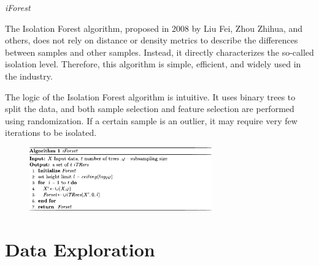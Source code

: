 \documentclass[
 size=14pt,
 paper=smartboard,  %
 mode=present, 		%
 display=slides, 	%
 style=tuliplab,  	%
 pauseslide,
 fleqn,leqno]{powerdot}
\begin{document}
\begin{slide}{\textit{iForest}}
\begin{justify}
\setlength{\parindent}{2em}
The Isolation Forest algorithm, proposed in 2008 by Liu Fei, Zhou Zhihua, and others, does not rely on distance or density metrics to describe the differences between samples and other samples. Instead, it directly characterizes the so-called isolation level. Therefore, this algorithm is simple, efficient, and widely used in the industry.
\end{justify}
\begin{justify}
\setlength{\parindent}{2em}
The logic of the Isolation Forest algorithm is intuitive. It uses binary trees to split the data, and both sample selection and feature selection are performed using randomization. If a certain sample is an outlier, it may require very few iterations to be isolated.
\end{justify}
\begin{figure}[H]
	\centering
	\includegraphics[width=0.7\textwidth]{figures/agm.eps}
	\label{fig:agm}
\end{figure}
\end{slide}




\section{Data Exploration}
\end{document}

